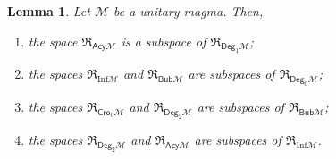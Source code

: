 \documentclass[10pt,reqno]{amsart}
\numberwithin{equation}{subsection}
\newtheorem{Lemma}[Theorem]{Lemma}
\newcommand{\Mca}{\mathcal{M}}
\newcommand{\Bub}{\mathsf{Bub}}
\newcommand{\Deg}{\mathsf{Deg}}
\newcommand{\Cro}{\mathsf{Cro}}
\newcommand{\Acy}{\mathsf{Acy}}
\newcommand{\Inf}{\mathrm{Inf}}
\newcommand{\Rel}{\mathfrak{R}}
\begin{document}
\begin{Lemma} \label{lem:inclusion_families_cliques}
    Let $\Mca$ be a unitary magma. Then,
    \begin{enumerate}[fullwidth,label={(\it\roman*)}]
        \item \label{item:inclusion_families_cliques_1}
        the space $\Rel_{\Acy\Mca}$ is a subspace of $\Rel_{\Deg_1\Mca}$;
        \item \label{item:inclusion_families_cliques_2}
        the spaces $\Rel_{\Inf\Mca}$ and $\Rel_{\Bub\Mca}$ are subspaces
        of $\Rel_{\Deg_0\Mca}$;
        \item \label{item:inclusion_families_cliques_3}
        the spaces $\Rel_{\Cro_0\Mca}$ and $\Rel_{\Deg_2\Mca}$ are
        subspaces of $\Rel_{\Bub\Mca}$;
        \item \label{item:inclusion_families_cliques_4}
        the spaces $\Rel_{\Deg_2\Mca}$ and $\Rel_{\Acy\Mca}$ are
        subspaces of $\Rel_{\Inf\Mca}$.
    \end{enumerate}
\end{Lemma}
\end{document}
